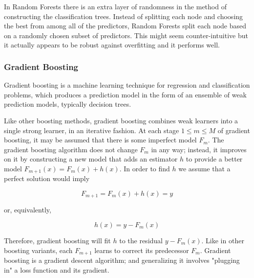 In Random Forests there is an extra layer of randomness in the method of constructing the classification trees. Instead of splitting each node and choosing the best from among all of the predictors, Random Forests split each node based on a randomly chosen subset of predictors. This might seem counter-intuitive but it actually appears to be robust against overfitting and it performs well.
\subsubsection{Gradient Boosting}
Gradient boosting is a machine learning technique for regression and classification problems, which produces a prediction model in the form of an ensemble of weak prediction models, typically decision trees.

Like other boosting methods, gradient boosting combines weak learners into a single strong learner, in an iterative fashion.
At each stage $1 \le m \le M$ of gradient boosting, it may be assumed that there is some imperfect model $F_m$. The gradient boosting algorithm does not change $F_m$ in any way; instead, it improves on it by constructing a new model that adds an estimator $h$ to provide a better model $F_{m+1}(x) = F_m(x) + h(x)$. In order to find $h$ we assume that a perfect solution would imply

    $$ F_{m+1} = F_m(x) + h(x) = y $$

or, equivalently,

    $$ h(x) = y - F_m(x) $$

Therefore, gradient boosting will fit $h$ to the residual $y - F_m(x)$. Like in other boosting variants, each $F_{m+1}$ learns to correct its predecessor $F_m$. Gradient boosting is a gradient descent algorithm; and generalizing it involves "plugging in" a loss function and its gradient.